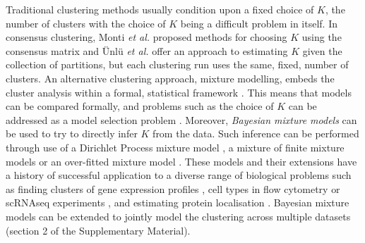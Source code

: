 \documentclass{bmcart}
\begin{document}


Traditional clustering methods usually condition upon a fixed choice of $K$, the number of clusters with the choice of $K$ being a difficult problem in itself. In consensus clustering, Monti {\em et al.} \cite{monti2003consensus} proposed methods for choosing $K$ using the consensus matrix and {\"U}nl{\"u} {\em et al.} \cite{UnluEstimatingnumberclusters2019} offer an approach to estimating $K$ given the collection of partitions, but each clustering run uses the same, fixed, number of clusters. An alternative clustering approach, mixture modelling, embeds the cluster analysis within a formal, statistical framework \citep{fraley2002model}. This means that models can be compared formally, and problems such as the choice of $K$ can be addressed as a model selection problem \citep{FraleyHowManyClusters1998}. Moreover, \emph{Bayesian mixture models} can be used to try to directly infer $K$ from the data. Such inference can be performed through use of a Dirichlet Process mixture model \citep{ferguson1973bayesian, AntoniakMixturesDirichletProcesses1974}, a mixture of finite mixture models \citep{richardson1997bayesian, miller2018mixture} or an over-fitted mixture model \citep{rousseau2011asymptotic}. These models and their extensions have a history of successful application to a diverse range of biological problems such as finding clusters of gene expression profiles \citep{medvedovic2002bayesian}, cell types in flow cytometry \citep{chan2008statistical, hejblum2019sequential} or scRNAseq experiments \citep{prabhakaran2016dirichlet}, and estimating protein localisation \citep{crook2018bayesian}. Bayesian mixture models can be extended to jointly model the clustering across multiple datasets \citep{kirk2012bayesian, gabasova2017clusternomics} (section 2 of the Supplementary Material).
\end{document}
